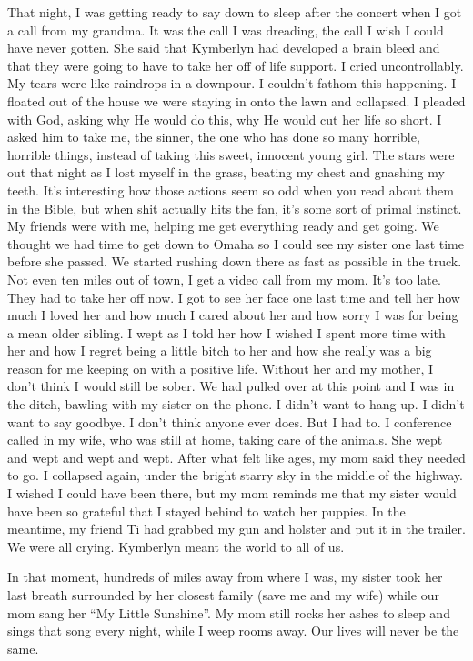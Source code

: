 That night, I was getting ready to say down to sleep after the concert when I got a call from my grandma.
It was the call I was dreading, the call I wish I could have never gotten.
She said that Kymberlyn had developed a brain bleed and that they were going to have to 
take her off of life support.
I cried uncontrollably.
My tears were like raindrops in a downpour.
I couldn't fathom this happening. 
I floated out of the house we were staying in onto the lawn and collapsed.
I pleaded with God, asking why He would do this, why He would cut her life so short.
I asked him to take me, the sinner, the one who has done so many horrible, horrible things, 
instead of taking this sweet, innocent young girl.
The stars were out that night as I lost myself in the grass, beating my chest and gnashing my teeth.
It's interesting how those actions seem so odd when you read about them in the Bible, but
when shit actually hits the fan, it's some sort of primal instinct.
My friends were with me, helping me get everything ready and get going. 
We thought we had time to get down to Omaha so I could see my sister one last time before she passed.
We started rushing down there as fast as possible in the truck.
Not even ten miles out of town, I get a video call from my mom. 
It's too late. 
They had to take her off now.
I got to see her face one last time and tell her how much I loved her and 
how much I cared about her and how sorry I was for being a mean older sibling.
I wept as I told her how I wished I spent more time with her and how I regret being a little bitch 
to her and how she really was a big reason for me keeping on with a positive life.
Without her and my mother, I don't think I would still be sober.
We had pulled over at this point and I was in the ditch, bawling with my sister on the phone.
I didn't want to hang up.
I didn't want to say goodbye.
I don't think anyone ever does.
But I had to.
I conference called in my wife, who was still at home, taking care of the animals.
She wept and wept and wept and wept.
After what felt like ages, my mom said they needed to go.
I collapsed again, under the bright starry sky in the middle of the highway.
I wished I could have been there, but my mom reminds me that my sister
would have been so grateful that I stayed behind to watch her puppies.
In the meantime, my friend Ti had grabbed my gun and holster and put it in the trailer.
We were all crying.
Kymberlyn meant the world to all of us.

In that moment, hundreds of miles away from where I was, 
my sister took her last breath surrounded by her closest family (save me and my wife)
while our mom sang her ``My Little Sunshine''.
My mom still rocks her ashes to sleep and sings that song every night, while I weep rooms away.
Our lives will never be the same.
